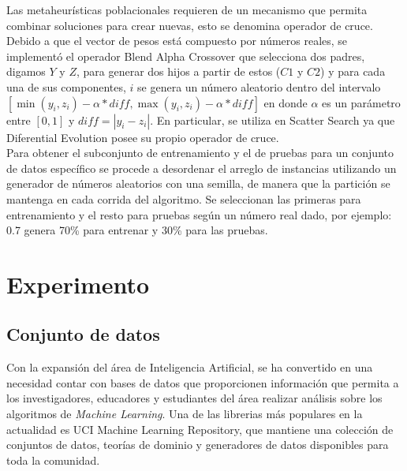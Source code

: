 \documentclass{ci5652}
\begin{document}
Las metaheurísticas poblacionales requieren de un mecanismo que permita combinar soluciones para crear nuevas, esto se denomina operador de cruce. Debido a que el vector de pesos está compuesto por números reales, se implementó el operador Blend Alpha Crossover que selecciona dos padres, digamos $Y$ y $Z$, para generar dos hijos a partir de estos ($C1$ y $C2$) y para cada una de sus componentes, $i$ se genera un número aleatorio dentro del intervalo $[\min(y_i, z_i) - \alpha*diff,\max(y_i, z_i) - \alpha*diff]$ en donde $\alpha$ es un parámetro entre $[0,1]$ y $diff = |y_i - z_i|$. En particular, se utiliza en Scatter Search ya que Diferential Evolution posee su propio operador de cruce.\\

Para obtener el subconjunto de entrenamiento y el de pruebas para un conjunto de datos específico se procede a desordenar el arreglo de instancias utilizando un generador de números aleatorios con una semilla, de manera que la partición se mantenga en cada corrida del algoritmo. Se seleccionan las primeras para entrenamiento y el resto para pruebas según un número real dado, por ejemplo: 0.7 genera 70\% para entrenar y 30\% para las pruebas.\\



\section{Experimento}


\subsection{Conjunto de datos}

Con la expansión del área de Inteligencia Artificial, se ha convertido en una
necesidad contar con bases de datos que proporcionen información que permita a
los investigadores, educadores y estudiantes del área realizar análisis sobre
los algoritmos de \textit{Machine Learning}. Una de las librerias más populares
en la actualidad es UCI Machine Learning Repository, que mantiene una colección
de conjuntos de datos, teorías de dominio y generadores de datos disponibles
para toda la comunidad.\\
\end{document}
